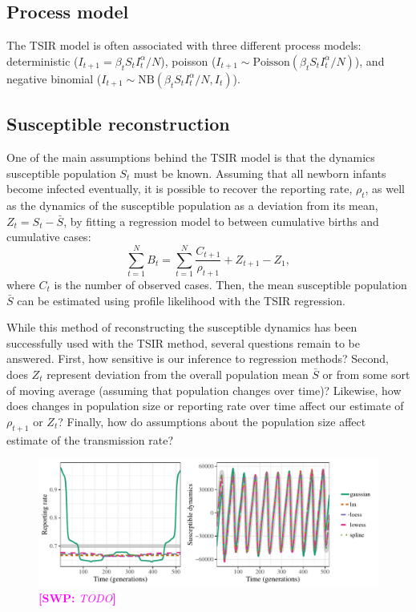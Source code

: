 \documentclass{article}
\newcommand{\comment}[3]{\textcolor{#1}{\textbf{[#2: }\textsl{#3}\textbf{]}}}
\newcommand{\swp}[1]{\comment{magenta}{SWP}{#1}}
\begin{document}
\subsection{Process model}

The TSIR model is often associated with three different process models: deterministic ($I_{t+1} = \beta_t S_t I_t^\alpha/N$), poisson ($I_{t+1} \sim \mathrm{Poisson}(\beta_t S_t I_t^\alpha/N)$), and negative binomial ($I_{t+1} \sim \mathrm{NB}(\beta_t S_t I_t^\alpha/N, I_t)$).


\subsection{Susceptible reconstruction}

One of the main assumptions behind the TSIR model is that the dynamics susceptible population $S_t$ must be known.
Assuming that all newborn infants become infected eventually, it is possible to recover the reporting rate, $\rho_t$, as well as the dynamics of the susceptible population as a deviation from its mean, $Z_t = S_t - \bar{S}$, by fitting a regression model to between cumulative births and cumulative cases: 
\begin{equation}
\sum_{t=1}^N B_t = \sum_{t=1}^N \frac{C_{t+1}}{\rho_{t+1}} + Z_{t+1} - Z_1,
\end{equation}
where $C_t$ is the number of observed cases. 
Then, the mean susceptible population $\bar S$ can be estimated using profile likelihood with the TSIR regression.

While this method of reconstructing the susceptible dynamics has been successfully used with the TSIR method, 
several questions remain to be answered.
First, how sensitive is our inference to regression methods?
Second, does $Z_t$ represent deviation from the overall population mean $\bar{S}$ or from some sort of moving average (assuming that population changes over time)?
Likewise, how does changes in population size or reporting rate over time affect our estimate of $\rho_{t+1}$ or $Z_t$?
Finally, how do assumptions about the population size affect estimate of the transmission rate?

\begin{figure}
\includegraphics[width=\textwidth]{../figure/susceptible_reconstruction_tsir.pdf}
\caption{
\swp{TODO}
}
\label{fig:tsirrecon}
\end{figure}
\end{document}
